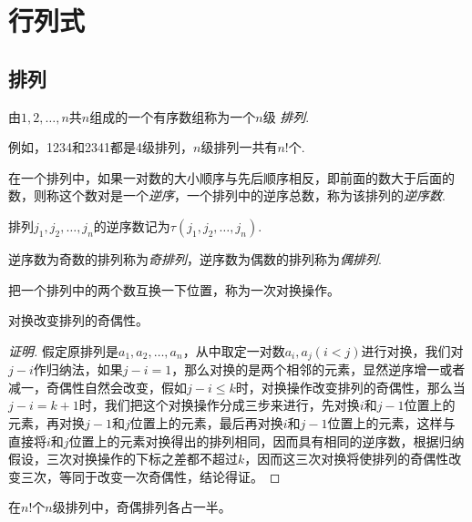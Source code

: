 
\section{行列式}
\label{sec:determinant}

\subsection{排列}
\label{sec:arrangement}

\begin{definition}
  由$1,2,\ldots,n$共$n$组成的一个有序数组称为一个$n$级 \emph{排列}.
\end{definition}

例如，1234和2341都是4级排列，$n$级排列一共有$n!$个.

\begin{definition}
  在一个排列中，如果一对数的大小顺序与先后顺序相反，即前面的数大于后面的数，则称这个数对是一个\emph{逆序}，一个排列中的逆序总数，称为该排列的\emph{逆序数}.
\end{definition}

排列$j_1,j_2,\ldots,j_n$的逆序数记为$\tau(j_1,j_2,\ldots,j_n)$.

\begin{definition}
  逆序数为奇数的排列称为\emph{奇排列}，逆序数为偶数的排列称为\emph{偶排列}.
\end{definition}

把一个排列中的两个数互换一下位置，称为一次对换操作。

\begin{theorem}
  对换改变排列的奇偶性。
\end{theorem}

\begin{proof}[证明]
  假定原排列是$a_1,a_2,\ldots,a_n$，从中取定一对数$a_i,a_j(i<j)$进行对换，我们对$j-i$作归纳法，如果$j-i=1$，那么对换的是两个相邻的元素，显然逆序增一或者减一，奇偶性自然会改变，假如$j-i\leqslant k$时，对换操作改变排列的奇偶性，那么当$j-i=k+1$时，我们把这个对换操作分成三步来进行，先对换$i$和$j-1$位置上的元素，再对换$j-1$和$j$位置上的元素，最后再对换$i$和$j-1$位置上的元素，这样与直接将$i$和$j$位置上的元素对换得出的排列相同，因而具有相同的逆序数，根据归纳假设，三次对换操作的下标之差都不超过$k$，因而这三次对换将使排列的奇偶性改变三次，等同于改变一次奇偶性，结论得证。
\end{proof}

\begin{inference}
  在$n!$个$n$级排列中，奇偶排列各占一半。
\end{inference}

